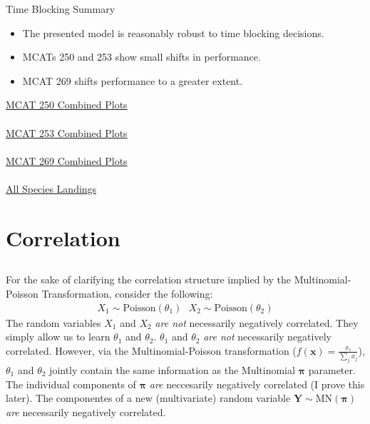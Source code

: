 \documentclass[ xcolor = pdftex, dvipsnames, table ]{beamer}
\begin{document}
%
\begin{frame}{Time Blocking Summary}	
        \begin{minipage}{0.49\textwidth}
	\begin{itemize}
	\item The presented model is reasonably robust to time blocking decisions.
	\item MCATs 250 and 253 show small shifts in performance.
	\item MCAT 269 shifts performance to a greater extent.  
	\end{itemize}
	\end{minipage}
        \begin{minipage}{0.49\textwidth}
	\begin{center}
	\href{https://github.com/gasduster99/sppComp/tree/master/try1/postSSC/25019781982345M4}{MCAT 250 Combined Plots}\\$~$\\
	\href{https://github.com/gasduster99/sppComp/tree/master/try1/postSSC/25319781982345M4}{MCAT 253 Combined Plots}\\$~$\\
	\href{https://github.com/gasduster99/sppComp/tree/master/try1/postSSC/26919781982345M4}{MCAT 269 Combined Plots}\\$~$\\
	\href{https://github.com/gasduster99/sppComp/tree/master/try1/postSSC/landDiagnostics/82345M4}{All Species Landings}
	\end{center}
	\end{minipage}
\end{frame}

%
%

%
\section{Correlation}
\subsection{}
\begin{frame}
	For the sake of clarifying the correlation structure implied by the Multinomial-Poisson Transformation, consider the following:
	\begin{align*}
		X_{1} \sim \text{Poisson}(\theta_1) ~~~ X_{2} \sim \text{Poisson}(\theta_2)
	\end{align*}
	The random variables $X_{1}$ and $X_{2}$ \textit{are not} necessarily 
	negatively correlated. They simply allow us to learn $\theta_1$ 
	and $\theta_2$. $\theta_1$ and $\theta_2$ \textit{are not} 
	necessarily negatively correlated. However, via the Multinomial-Poisson 
	transformation ($f(\bm{x})=\frac{x_i}{\sum_j x_j}$), $\theta_1$ and $\theta_2$ 
	jointly contain the same information as the Multinomial $\bm{\pi}$ parameter. 
	The individual components of $\bm{\pi}$ \textit{are} neccesarily negatively 
	correlated (I prove this later). The componentes of a new (multivariate) random variable 
	$\bm{Y} \sim \text{MN}(\bm{\pi})$ \textit{are} necessarily negatively correlated. 
\end{frame}
\end{document}

